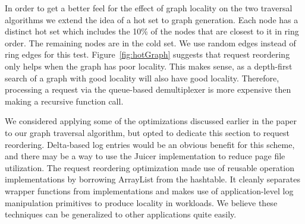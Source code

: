 \documentclass[10pt,letterpaper,twocolumn,english]{article}
\newcommand{\oasys}{Juicer\xspace}
\begin{document}
In order to get a better feel for the effect of graph locality on the
two traversal algorithms we extend the idea of a hot set to graph
generation.  Each node has a distinct hot set which includes the 10\%
of the nodes that are closest to it in ring order.  The remaining
nodes are in the cold set.  We use random edges instead of ring edges
for this test.  Figure~\ref{fig:hotGraph} suggests that request reordering 
only helps when the graph has poor locality.  This makes sense, as a 
depth-first search of a graph with good locality will also have good 
locality.  Therefore, processing a request via the queue-based demultiplexer 
is more expensive then making a recursive function call.

We considered applying some of the optimizations discussed earlier in
the paper to our graph traversal algorithm, but opted to dedicate this
section to request reordering.  Delta-based log entries would be an
obvious benefit for this scheme, and there may be a way to use the
\oasys implementation to reduce page file utilization.  The request 
reordering optimization made use of reusable operation implementations 
by borrowing ArrayList from the hashtable.  It cleanly separates wrapper 
functions from implementations and makes use of application-level log 
manipulation primitives to produce locality in workloads.  We believe 
these techniques can be generalized to other applications quite easily.
\end{document}
